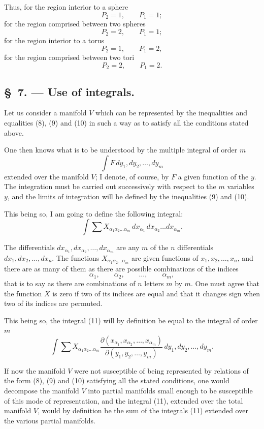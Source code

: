 \documentclass{article}
\begin{document}
Thus, for the region interior to a sphere
\[
P_{2} = 1, \qquad P_{1} = 1;
\]
for the region comprised between two spheres
\[
P_{2} = 2, \qquad P_{1} = 1;
\]
for the region interior to a torus
\[
P_{2} = 1, \qquad P_{1} = 2,
\]
for the region comprised between two tori
\[
P_{2} = 2, \qquad P_{1} = 2.
\]

\subsection*{\S~7. --- Use of integrals.}

Let us consider a manifold $V$ which can be represented by the inequalities and equalities (8), (9) and (10) in such a way as to satisfy all the conditions stated above.

One then knows what is to be understood by the multiple integral of order $m$
\[
\int F\,dy_{1}, dy_{2}, \ldots, dy_{m}
\]
extended over the manifold $V$; I denote, of course, by $F$ a given function of the $y$. The integration must be carried out successively with respect to the $m$ variables $y$, and the limits of integration will be defined by the inequalities (9) and (10).

This being so, I am going to define the following integral:
\[
\int \sum X_{\alpha_{1}\alpha_{2}\ldots\alpha_{m}}\,dx_{\alpha_{1}}\,dx_{\alpha_{2}} \ldots dx_{\alpha_{m}}. \tag{11}
\]

The differentials $dx_{\alpha_{1}}, dx_{\alpha_{2}}, \ldots, dx_{\alpha_{m}}$ are any $m$ of the $n$ differentials $dx_{1}, dx_{2}, \ldots, dx_{n}$. The functions $X_{\alpha_{1}\alpha_{2}\ldots\alpha_{m}}$ are given functions of $x_{1}, x_{2}, \ldots, x_{n}$, and there are as many of them as there are possible combinations of the indices
\[
\alpha_{1}, \qquad \alpha_{2}, \qquad \ldots, \qquad \alpha_{m},
\]
that is to say as there are combinations of $n$ letters $m$ by $m$. One must agree that the function $X$ is zero if two of its indices are equal and that it changes sign when two of its indices are permuted.

This being so, the integral (11) will by definition be equal to the integral of order $m$
\[
\int \sum X_{\alpha_{1}\alpha_{2}\ldots\alpha_{m}} \frac{\partial(x_{\alpha_{1}}, x_{\alpha_{2}}, \ldots, x_{\alpha_{m}})}{\partial(y_{1}, y_{2}, \ldots, y_{m})}\,dy_{1}, dy_{2}, \ldots, dy_{m}.
\]

If now the manifold $V$ were not susceptible of being represented by relations of the form (8), (9) and (10) satisfying all the stated conditions, one would decompose the manifold $V$ into partial manifolds small enough to be susceptible of this mode of representation, and the integral (11), extended over the total manifold $V$, would by definition be the sum of the integrals (11) extended over the various partial manifolds.
\end{document}
